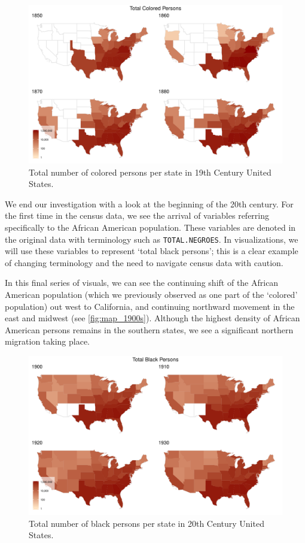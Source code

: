 \documentclass[DIV=calc, paper=a4, fontsize=10pt, twocolumn]{scrartcl}\usepackage[]{graphicx}\usepackage[]{color}
\newenvironment{knitrout}{}{} %
\begin{document}
\begin{knitrout}
\color{fgcolor}\begin{figure}[h]
\includegraphics[width=.5\textwidth]{figure/map_1800s-1} \caption[Total number of colored persons per state in 19th Century United States]{Total number of colored persons per state in 19th Century United States.}\label{fig:map_1800s}
\end{figure}


\end{knitrout}

\par We end our investigation with a look at the beginning of the 20th century. For the first time in the census data, we see the arrival of variables referring specifically to the African American population. These variables are denoted in the original data with terminology such as \texttt{TOTAL.NEGROES}. In visualizations, we will use these variables to represent `total black persons'; this is a clear example of changing terminology and the need to navigate census data with caution. 

\par In this final series of visuals, we can see the continuing shift of the African American population (which we previously observed as one part of the `colored' population) out west to California, and continuing northward movement in the east and midwest (see \autoref{fig:map_1900s}). Although the highest density of African American persons remains in the southern states, we see a significant northern migration taking place. 


\begin{knitrout}
\color{fgcolor}\begin{figure}[h]
\includegraphics[width=.5\textwidth]{figure/map_1900s-1} \caption[Total number of black persons per state in 20th Century United States]{Total number of black persons per state in 20th Century United States.}\label{fig:map_1900s}
\end{figure}


\end{knitrout}
\end{document}
